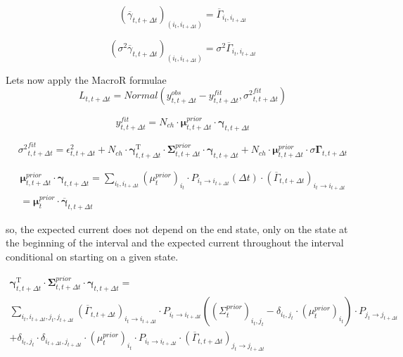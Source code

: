\documentclass[pdflatex,sn-mathphys-num]{sn-jnl}%
\theoremstyle{thmstyleone}%
\theoremstyle{thmstyletwo}%
\theoremstyle{thmstylethree}%
\begin{document}
\begin{equation}
	({\overline \gamma}_{t,t+\Delta t })_{(i_t, i_{t+\Delta t})} = {\overline \Gamma}_{i_t,i_{t+\Delta t}}
\end{equation}

\begin{equation}
	(\sigma^2{\overline \gamma}_{t,t+\Delta t })_{(i_t, i_{t+\Delta t})} = \sigma^2{\overline \Gamma}_{i_t,i_{t+\Delta t}}
\end{equation}

Lets now apply the MacroR formulae
\begin{equation}
	L_{t, t+\Delta t}= Normal (y^{obs}_{t, t+\Delta t}-y^{fit}_{t, t+\Delta t}, {\sigma^{2}}^{fit}_{t, t+\Delta t})
\end{equation}

\begin{equation}
	y^{fit}_{t,t+\Delta t} = N_{ch} \cdot \mathbf \mu^{prior}_{t,t+\Delta t} \cdot \mathbf \gamma_{t,t+\Delta t}
\end{equation}

\begin{equation}
	{\sigma^2}^{fit}_{t, t+\Delta t}
	= \epsilon^2_{t, t+\Delta t} +N_{ch} \cdot {\mathbf \gamma}^{\mathrm{T}}_{t, t+\Delta t} \cdot \mathbf \Sigma^{prior}_{t, t+\Delta t} \cdot \mathbf \gamma_{t, t+\Delta t}
	+ N_{ch} \cdot \mathbf \mu^{prior}_{t, t+\Delta t} \cdot {\sigma \mathbf  \Gamma}_{t, t+\Delta t}
\end{equation}

\begin{multline}
	\mathbf \mu^{prior}_{t,t+\Delta t} \cdot \mathbf \gamma_{t,t+\Delta t} =
	\sum_{i_t, i_{t+ \Delta t}} {(\mu^{prior}_{t})_{i_t}  \cdot P_{i_t \rightarrow i_{t+ \Delta t}}(\Delta t) \cdot ({\overline \Gamma_{t,t + \Delta t}})_{i_t \rightarrow i_{t+\Delta t}}}\\= \mathbf \mu^{prior}_t \cdot  \overline {\mathbf \gamma}_{t, t+\Delta t}
\end{multline}






so, the expected current does not depend on the end state, only on the state at the beginning of the interval and the expected current throughout the interval conditional on starting on a given state. 

\begin{multline}
	{\mathbf \gamma}^{\mathrm{T}}_{t, t+\Delta t} \cdot \mathbf \Sigma^{prior}_{t, t+\Delta t} \cdot \mathbf \gamma_{t, t+\Delta t}= \\
	\sum_{i_t, i_{t +\Delta t},j_t, j_{t +\Delta t}}
	({\overline \Gamma_{t,t + \Delta t}})_{i_t \rightarrow i_{t+\Delta t}} \cdot 
	P_{i_t \rightarrow i_{t+ \Delta t}} \left((\Sigma^{prior}_{t})_{i_t ,j_t} - \delta_{i_t, j_t} \cdot (\mu^{prior}_t)_{i_t} \right)  \cdot P_{j_t \rightarrow j_{t+ \Delta t}} \\+\delta_{i_t, j_t} \cdot \delta_{i_{t+ \Delta t}, j_{t+ \Delta t}} \cdot (\mu^{prior}_t)_{i_t}\cdot P_{i_t \rightarrow i_{t+ \Delta t}} 
	\cdot 
	({\overline \Gamma_{t,t + \Delta t}})_{j_t \rightarrow j_{t+\Delta t}} 
\end{multline}
\end{document}

